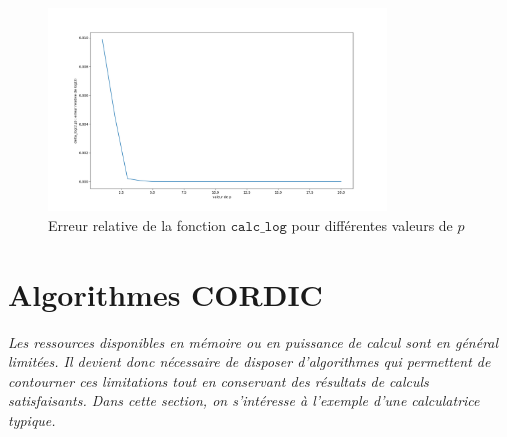 \documentclass{article}
\begin{document}
\begin{figure}[H]
 \centering
 \includegraphics[width=0.8\textwidth]{partie2_relative_error_log.png}
 \caption{Erreur relative de la fonction $\texttt{calc\_log}$ pour différentes valeurs de $p$}
 \label{fig:relative_error_log}        
\end{figure}




 



  




\section{Algorithmes CORDIC}
\label{sec:cordic}

\textit{Les ressources disponibles en m\'emoire ou en puissance de calcul sont en g\'en\'eral limit\'ees. Il devient donc n\'ecessaire de disposer d'algorithmes qui permettent de contourner ces limitations tout en conservant des résultats de calculs satisfaisants. Dans cette section, on s'int\'eresse à l'exemple d'une calculatrice typique.}
\vskip 1mm ~


\end{document}
